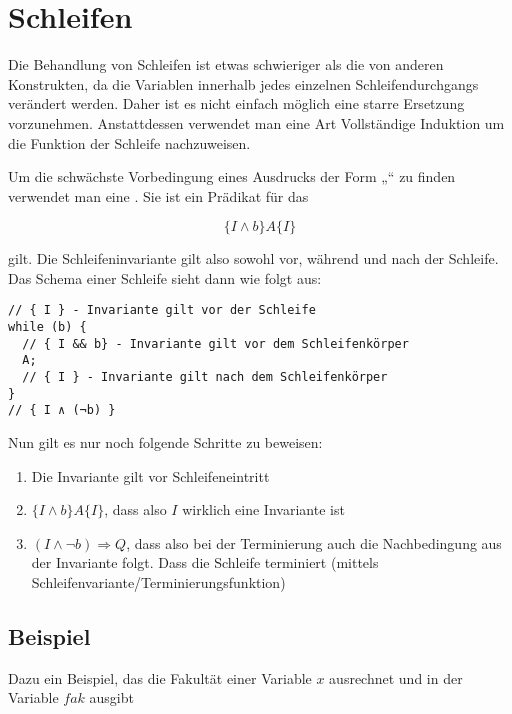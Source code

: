 \documentclass{lehramt-informatik-haupt}
\begin{document}
\section{Schleifen}

Die Behandlung von Schleifen ist etwas schwieriger als die von anderen
Konstrukten, da die Variablen innerhalb jedes einzelnen
Schleifendurchgangs verändert werden. Daher ist es nicht einfach möglich
eine starre Ersetzung vorzunehmen. Anstattdessen verwendet man eine Art
Vollständige Induktion um die Funktion der Schleife nachzuweisen.

Um die schwächste Vorbedingung eines Ausdrucks der Form „“ zu finden verwendet man eine . Sie
ist ein Prädikat für das

\begin{displaymath}
\{ I \wedge b \} A \{ I \}
\end{displaymath}

\noindent
gilt. Die Schleifeninvariante gilt also sowohl vor, während und nach der
Schleife. Das Schema einer Schleife sieht dann wie folgt aus:

\begin{verbatim}
// { I } - Invariante gilt vor der Schleife
while (b) {
  // { I && b} - Invariante gilt vor dem Schleifenkörper
  A;
  // { I } - Invariante gilt nach dem Schleifenkörper
}
// { I ∧ (¬b) }
\end{verbatim}

Nun gilt es nur noch folgende Schritte zu beweisen:

\begin{enumerate}
\item Die Invariante gilt vor Schleifeneintritt

\item $\{ I \wedge b \} A \{ I \}$, dass also $I$ wirklich eine
Invariante ist

\item $(I \wedge \neg b) \Rightarrow Q$, dass also bei der Terminierung
auch die Nachbedingung aus der Invariante folgt. Dass die Schleife
terminiert (mittels Schleifenvariante/Terminierungsfunktion)
\end{enumerate}

\subsection{Beispiel}

Dazu ein Beispiel, das die Fakultät einer Variable $x$ ausrechnet und in
der Variable $fak$ ausgibt
\end{document}
